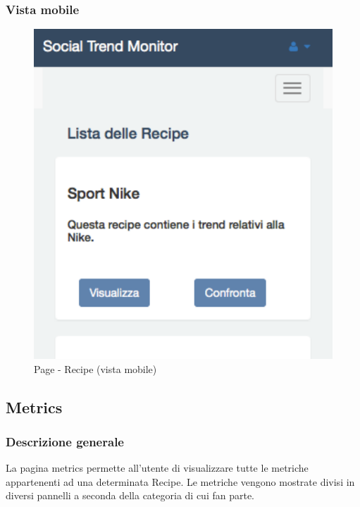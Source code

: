 		\subsubsection{Vista mobile} %
		\begin{figure}[htbp]
			\centering
			\centerline{\includegraphics[scale=0.5]{./images/mockup/recipe_vm.pdf}}
			\caption{Page - Recipe (vista mobile)}
		\end{figure}

	\subsection{Metrics} %
	\label{sub:metrics}
		\subsubsection{Descrizione generale} %
		La pagina metrics permette all'utente di visualizzare tutte le metriche appartenenti ad una determinata Recipe. Le metriche vengono mostrate divisi in diversi pannelli a seconda della categoria di cui fan parte.

